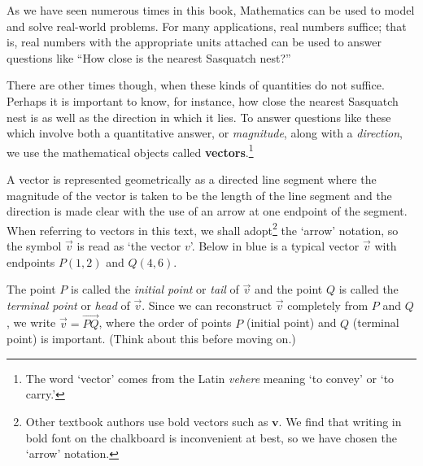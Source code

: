\documentclass{ximera}
\begin{document}
	\author{Stitz-Zeager}



\setcounter{footnote}{0}

\label{Vectors}

As we have seen numerous times in this book, Mathematics can be used to model and solve real-world problems.  For many applications, real numbers suffice; that is, real numbers with the appropriate units attached can be used to answer questions like ``How close is the nearest Sasquatch nest?''   

 

There are other times though, when these kinds of quantities do not suffice.  Perhaps it is important to know, for instance, how close the nearest Sasquatch nest is as well as the direction in which it lies.  To answer questions like these which involve both a quantitative answer, or \textit{magnitude}, along with a \textit{direction}, we use the mathematical objects called \textbf{vectors}.\footnote{The word `vector' comes from the Latin \textit{vehere} meaning `to convey' or `to carry.'}    

 

A vector is represented geometrically as a directed line segment where the magnitude of the vector is taken to be the length of the line segment and the direction is made clear with the use of an arrow at one endpoint of the segment.   When referring to vectors in this text, we shall adopt\footnote{Other textbook authors use bold vectors such as $\textbf{v}$.  We find that writing in bold font on the chalkboard is inconvenient at best, so we have chosen the `arrow' notation.} the `arrow' notation, so the symbol  $\overrightarrow{v}$ is read as `the vector $v$'. Below in blue is a typical vector $\overrightarrow{v}$ with endpoints $P\left(1, 2\right)$ and $Q\left(4, 6\right)$. 

 

The point $P$  is called the \textit{initial point} or \textit{tail} of  $\overrightarrow{v}$ and the point $Q$ is called the \textit{terminal point} or \textit{head} of  $\overrightarrow{v}$.   Since we can reconstruct $\overrightarrow{v}$ completely from $P$ and $Q$, we write $\overrightarrow{v} = \overrightarrow{PQ}$, where the order of points $P$ (initial point) and $Q$ (terminal point) is important. (Think about this before moving on.)
\end{document}
